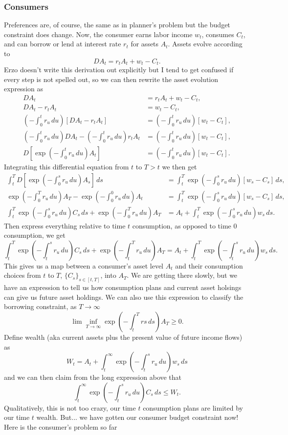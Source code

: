 \documentclass[11pt,english]{article}
\begin{document}
\subsubsection{Consumers}
Preferences are, of course, the same as in planner's problem but the budget constraint does change. Now, the consumer earns labor income $w_t$, consumes $C_t$, and can borrow or lend at interest rate $r_t$ for assets $A_t$. Assets evolve according to $$DA_t = r_tA_t + w_t - C_t.$$ Erzo doesn't write this derivation out explicitly but I tend to get confused if every step is not spelled out, so we can then rewrite the asset evolution expression as
\begin{align*}
DA_t &= r_tA_t + w_t - C_t,\\
DA_t - r_tA_t &=  w_t - C_t,\\
\left(-\int_0^t r_u\,du\right)\left[DA_t - r_tA_t\right] &=  \left(-\int_0^t r_u\,du\right)\left[w_t - C_t\right],\\
\left(-\int_0^t r_u\,du\right)DA_t - \left(-\int_0^t r_u\,du\right)r_tA_t &=  \left(-\int_0^t r_u\,du\right)\left[w_t - C_t\right],\\
D\left[\exp\left(-\int_0^tr_u\,du\right)A_t\right] &=  \left(-\int_0^t r_u\,du\right)\left[w_t - C_t\right]. 
\end{align*}Integrating this differential equation from $t$ to $T > t$ we then get 
\begin{align*}
\int_t^T D\left[\exp\left(-\int_0^sr_u\,du\right)A_s\right] \,ds&=  \int_t^T\exp\left(-\int_0^s r_u\,du\right)\left[w_s - C_s\right]\,ds,\\
\exp\left(-\int_0^T r_u\,du\right)A_T -  \exp\left(-\int_0^0 r_u\,du\right)A_t &= \int_t^T\exp\left(-\int_0^s r_u\,du\right)\left[w_s - C_s\right]\,ds,\\
\int_t^T\exp\left(-\int_0^s r_u\,du\right) C_s\,ds + \exp\left(-\int_0^T r_u\,du\right)A_T &= A_t + \int_t^T\exp\left(-\int_0^s r_u\,du\right) w_s \,ds.
\end{align*}Then express everything relative to time $t$ consumption, as opposed to time $0$ consumption, we get
$$\int_t^T\exp\left(-\int_t^s r_u\,du\right) C_s\,ds + \exp\left(-\int_t^T r_u\,du\right)A_T = A_t + \int_t^T\exp\left(-\int_t^s r_u\,du\right) w_s \,ds.$$
This gives us a map between a consumer's asset level $A_t$ and their consumption choices from $t$ to $T$, $\{C_s\}_{s\in [t,T]}$, into $A_T$. We are getting there slowly, but we have an expression to tell us how consumption plans and current asset holsings can give us future asset holdings. We can also use this expression to classify the borrowing constraint, as $T\to \infty$ $$\lim\inf_{T\to \infty} \exp\left(-\int_t^Trs\,ds\right)A_T\geq 0.$$ Define wealth (aka current assets plus the present value of future income flows) as $$W_t = A_t + \int_t^\infty \exp\left(-\int_t^s r_u\,du\right)w_s\,ds$$ and we can then claim from the long expression above that $$\int_t^\infty \exp\left(-\int_t^s r_u\,du\right)C_s\,ds \leq W_t.$$Qualitatively, this is not too crazy, our time $t$ consumption plans are limited by our time $t$ wealth. But... we have gotten our consumer budget constraint now! Here is the consumer's problem so far
\end{document}
